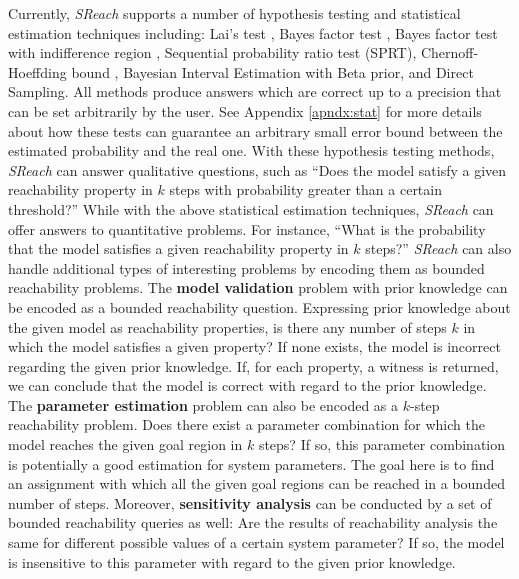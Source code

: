Currently, {\it SReach} supports a number of hypothesis testing and statistical estimation techniques including: {Lai's test} \cite{lai1988nearly}, {Bayes factor test} \cite{kass1995bayes}, {Bayes factor test with indifference region} \cite{younes2005verification}, {Sequential probability ratio test (SPRT)}\cite{wald1945sequential}, {Chernoff-Hoeffding bound} \cite{hoeffding1963probability}, {Bayesian Interval Estimation with Beta prior}\cite{zuliani2010bayesian}, and {Direct Sampling}. All methods produce answers which are correct up to a precision that can be set arbitrarily by the user. See Appendix \ref{apndx:stat} for more details about how these tests can guarantee an arbitrary small error bound between the estimated probability and the real one. With these hypothesis testing methods, {\it SReach} can answer qualitative questions, such as ``Does the model satisfy a given reachability property in $k$ steps with probability greater than a certain threshold?'' While with the above statistical estimation techniques, {\it SReach} can offer answers to quantitative problems. For instance, ``What is the probability that the model satisfies a given reachability property in $k$ steps?''  {\it SReach} can also handle additional types of interesting problems by encoding them as bounded reachability problems. The {\bf model validation} problem with prior knowledge can be encoded as a bounded reachability question. Expressing prior knowledge about the given model as reachability properties, is there any number of steps $k$ in which the model satisfies a given property? If none exists, the model is incorrect regarding the given prior knowledge. If, for each property, a witness is returned, we can conclude that the model is correct with regard to the prior knowledge. The {\bf parameter estimation} problem can also be encoded as a $k$-step reachability problem. Does there exist a parameter combination for which the model reaches the given goal region in $k$ steps? If so, this parameter combination is potentially a good estimation for system parameters. The goal here is to find an assignment with which all the given goal regions can be reached in a bounded number of steps. Moreover, {\bf sensitivity analysis} can be conducted by a set of bounded reachability queries as well: Are the results of reachability analysis the same for different possible values of a certain system parameter? If so, the model is insensitive to this parameter with regard to the given prior knowledge.


